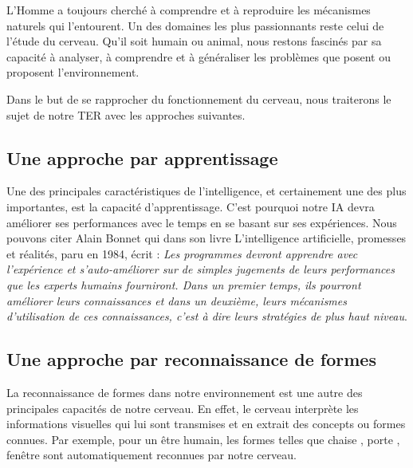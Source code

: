 L’Homme a toujours cherché à comprendre et à reproduire les mécanismes naturels qui l'entourent. Un des domaines les plus passionnants reste celui de l'étude du cerveau. Qu'il soit humain ou animal, nous restons fascinés par sa capacité à analyser, à comprendre et à généraliser les problèmes que posent ou \og proposent \fg{} l'environnement.

Dans le but de se rapprocher du fonctionnement du cerveau, nous traiterons le sujet de notre TER avec les approches suivantes.


\subsection{Une approche par apprentissage}

Une des principales caractéristiques de l'intelligence, et certainement une des plus importantes, est la capacité d'apprentissage. C'est pourquoi notre IA devra améliorer ses performances avec le temps en se basant sur ses expériences. Nous pouvons citer Alain Bonnet qui dans son livre \og L'intelligence artificielle, promesses et réalités\fg{}, paru en 1984, écrit : \og \textit{Les programmes devront apprendre  avec l'expérience et s'auto-améliorer sur de simples jugements de leurs performances que les experts humains fourniront. Dans un premier temps, ils pourront améliorer leurs connaissances et dans un deuxième, leurs mécanismes d'utilisation de ces connaissances, c'est à dire leurs stratégies de plus haut niveau}\fg{}.


\subsection{Une approche par reconnaissance de formes}

La reconnaissance de formes dans notre environnement est une autre des principales capacités de notre cerveau. En effet, le cerveau interprète les informations visuelles qui lui sont transmises et en extrait des concepts ou formes connues. Par exemple, pour un être humain, les formes telles que \og chaise \fg{}, \og porte \fg{}, \og fenêtre \fg{} sont automatiquement reconnues par notre cerveau.

